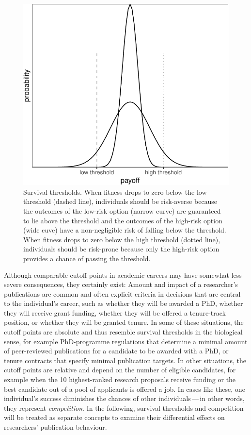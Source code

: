 \documentclass[british,,man,floatsintext]{apa6}
\begin{document}
\begin{figure}
\centering
\includegraphics{rr-risk-sensitivity_files/figure-latex/varianceplot-1.pdf}
\caption{\label{fig:varianceplot}Survival thresholds. When fitness drops to zero below the low threshold (dashed line), individuals should be risk-averse because the outcomes of the low-risk option (narrow curve) are guaranteed to lie above the threshold and the outcomes of the high-risk option (wide cuve) have a non-negligible risk of falling below the threshold. When fitness drops to zero below the high threshold (dotted line), individuals should be risk-prone because only the high-risk option provides a chance of passing the threshold.}
\end{figure}

Although comparable cutoff points in academic careers may have somewhat less severe consequences, they certainly exist:
Amount and impact of a researcher's publications are common and often explicit criteria in decisions that are central to the individual's career, such as whether they will be awarded a PhD, whether they will receive grant funding, whether they will be offered a tenure-track position, or whether they will be granted tenure.
In some of these situations, the cutoff points are absolute and thus resemble survival thresholds in the biological sense, for example PhD-programme regulations that determine a minimal amount of peer-reviewed publications for a candidate to be awarded with a PhD, or tenure contracts that specify minimal publication targets.
In other situations, the cutoff points are relative and depend on the number of eligible candidates, for example when the 10 highest-ranked research proposals receive funding or the best candidate out of a pool of applicants is offered a job.
In cases like these, one individual's success diminishes the chances of other individuals\(\,\)---\(\,\)in other words, they represent \emph{competition}.
In the following, survival thresholds and competition will be treated as separate concepts to examine their differential effects on researchers' publication behaviour.
\end{document}
